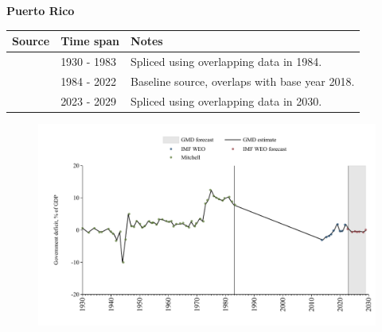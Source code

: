 \documentclass[12pt,a4paper,landscape]{article}
\begin{document}
\begin{adjustbox}{max totalsize={\paperwidth}{\paperheight},center}
\begin{minipage}[t][\textheight][t]{\textwidth}
\vspace*{0.5cm}
{}
\begin{center}
{\Large\bfseries Puerto Rico}
\end{center}
\vspace{0.5cm}
\begin{table}[H]
\centering
\small
\begin{tabular}{|l|l|l|}
\hline
\textbf{Source} & \textbf{Time span} & \textbf{Notes} \\
\hline
\rowcolor{white}\cite{Mitchell}& 1930 - 1983 &Spliced using overlapping data in 1984.\\
\rowcolor{lightgray}\cite{IMF_WEO}& 1984 - 2022 &Baseline source, overlaps with base year 2018.\\
\rowcolor{white}\cite{IMF_WEO_forecast}& 2023 - 2029 &Spliced using overlapping data in 2030.\\
\hline
\end{tabular}
\end{table}
\begin{figure}[H]
\centering
\includegraphics[width=\textwidth,height=0.6\textheight,keepaspectratio]{graphs/PRI_govdef_GDP.pdf}
\end{figure}
\end{minipage}
\end{adjustbox}
\end{document}
